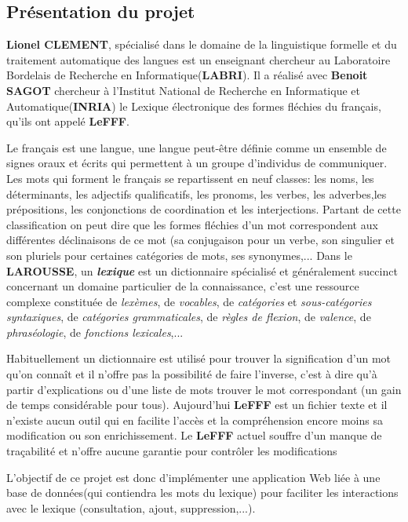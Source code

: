 \documentclass[a4paper, 12pt]{article}
\begin{document}
\subsection{Présentation du projet}

{\textbf{Lionel CLEMENT}, spécialisé dans le domaine de la linguistique formelle et du traitement automatique des langues est un enseignant chercheur au Laboratoire Bordelais de Recherche en Informatique(\textbf{LABRI}). Il a réalisé avec \textbf{Benoit SAGOT} chercheur à l'Institut National de Recherche en Informatique et Automatique(\textbf{INRIA})  le Lexique électronique des formes fléchies du français, qu'ils ont appelé \textbf{LeFFF}.\par}
{Le français est une langue, une langue peut-être définie comme un ensemble de signes oraux et écrits qui permettent à un groupe d'individus de communiquer. Les mots qui forment le français se repartissent en neuf classes: les noms, les déterminants, les adjectifs qualificatifs, les pronoms, les verbes, les adverbes,les prépositions, les conjonctions de coordination et les interjections. Partant de cette classification on peut dire que les formes fléchies d'un mot correspondent aux différentes déclinaisons de ce mot (sa conjugaison pour un verbe, son singulier et son pluriels pour certaines catégories de mots, ses synonymes,...
Dans le \textbf{LAROUSSE}, un \textit{\bf lexique} est un dictionnaire spécialisé et généralement succinct concernant un domaine particulier de la connaissance, c'est une ressource complexe constituée de \textit{lexèmes}, de \textit{vocables}, de \textit{catégories} et \textit{sous-catégories syntaxiques}, de \textit{catégories grammaticales}, de \textit{règles de flexion}, de \textit{valence}, de \textit{phraséologie}, de \textit{fonctions lexicales},...\par}

{Habituellement un dictionnaire est utilisé pour trouver la signification d'un mot qu'on connaît et il n'offre pas la possibilité de faire l'inverse, c'est à dire qu'à partir d'explications ou d'une liste de mots trouver le mot correspondant (un gain de temps considérable pour tous). Aujourd'hui \textbf{LeFFF} est un fichier texte et il n'existe aucun outil qui en facilite l'accès et la compréhension encore moins sa modification ou son enrichissement. Le \textbf{LeFFF} actuel souffre d'un manque de traçabilité et n'offre aucune garantie pour contrôler les modifications\par}

{L'objectif de ce projet est donc d'implémenter une application Web liée à une base de données(qui contiendra les mots du lexique) pour faciliter les interactions avec le lexique (consultation, ajout, suppression,...).\par}
\end{document}
